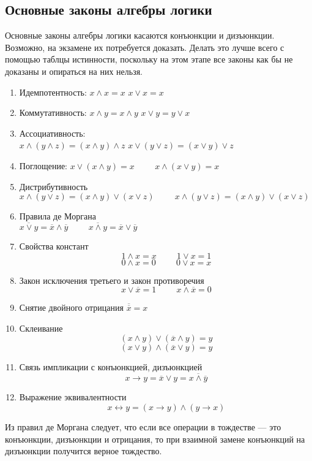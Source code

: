 \documentclass[14pt, a4paper]{extarticle}
\begin{document}
\subsection{Основные законы алгебры логики}
Основные законы алгебры логики касаются конъюнкции и дизъюнкции. Возможно, на экзамене их потребуется доказать. Делать это лучше всего с помощью таблцы истинности, поскольку на этом этапе все законы как бы не доказаны и опираться на них нельзя.
\begin{enumerate}
  \item Идемпотентность: $x \land x = x$ \hspace{2cm} $x \lor x = x$
  \item Коммутативность: $x \land y = x \land y$ \hspace{2cm} $x \lor y = y \lor x$
  \item Ассоциативность: \\ $x \land (y \land z) = (x \land y) \land z$ \hspace{1cm} $x \lor (y \lor z) = (x \lor y) \lor z$
  \item Поглощение: $x \lor (x \land y) = x \hspace{1cm} x \land (x \lor y) = x$
  \item Дистрибутивность \\ $x \land (y \lor z) = (x \land y) \lor (x \lor z) \hspace{1cm} x \land (y \lor z) = (x \land y) \lor (x \lor z)$
  \item Правила де Моргана \\
  $\overline{x \lor y} = \overline x \land \overline y \hspace{1cm} \overline{x \land y} = \overline x \lor \overline y$
  \item Свойства констант
  $$ 1 \land x = x \hspace{1cm} 1 \lor x = 1 $$
  $$ 0 \land x = 0 \hspace{1cm} 0 \lor x = x $$
  \item Закон исключения третьего и закон противоречия
  $$ x \lor \overline x = 1 \hspace{1cm} x \land \overline x = 0$$
  \item Снятие двойного отрицания $\overline{\overline{x}} = x$
  \item Склеивание
  $$ (x \land y) \lor (\overline x \land y) = y$$
  $$ (x \lor y) \land (\overline x \lor y) = y$$
  \item Связь импликации с конъюнкцией, дизъюнкцией
  $$ x \rightarrow y = \overline{x} \lor y = \overline{x \land \overline{y}}$$
  \item Выражение эквивалентности
  $$ x \leftrightarrow y = (x \rightarrow y) \land (y \rightarrow x)$$
\end{enumerate}
Из правил де Моргана следует, что если все операции в тождестве --- это конъюнкции, дизъюнкции и отрицания, то при взаимной замене конъюнкций на дизъюнкции получится верное тождество.
\end{document}
